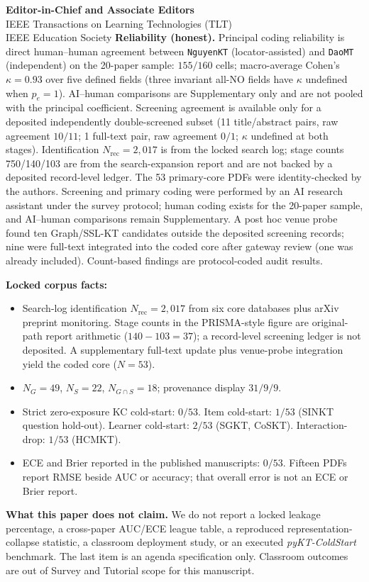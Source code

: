 \documentclass[11pt]{letter}
\begin{document}
\begin{letter}{
\textbf{Editor-in-Chief and Associate Editors}\\
IEEE Transactions on Learning Technologies (TLT)\\
IEEE Education Society
}
\textbf{Reliability (honest).} Principal coding reliability is direct human--human agreement between \texttt{NguyenKT} (locator-assisted) and \texttt{DaoMT} (independent) on the 20-paper sample: $155/160$ cells; macro-average Cohen's $\kappa=0.93$ over five defined fields (three invariant all-NO fields have $\kappa$ undefined when $p_e=1$). AI--human comparisons are Supplementary only and are not pooled with the principal coefficient. Screening agreement is available only for a deposited independently double-screened subset (11 title/abstract pairs, raw agreement $10/11$; 1 full-text pair, raw agreement $0/1$; $\kappa$ undefined at both stages). Identification $N_{\mathrm{rec}}=2{,}017$ is from the locked search log; stage counts 750/140/103 are from the search-expansion report and are not backed by a deposited record-level ledger. The 53 primary-core PDFs were identity-checked by the authors. Screening and primary coding were performed by an AI research assistant under the survey protocol; human coding exists for the 20-paper sample, and AI--human comparisons remain Supplementary. A post hoc venue probe found ten Graph/SSL-KT candidates outside the deposited screening records; nine were full-text integrated into the coded core after gateway review (one was already included). Count-based findings are protocol-coded audit results.

\textbf{Locked corpus facts:}
\begin{itemize}
    \item Search-log identification $N_{\mathrm{rec}}=2{,}017$ from six core databases plus arXiv preprint monitoring. Stage counts in the PRISMA-style figure are original-path report arithmetic ($140-103=37$); a record-level screening ledger is not deposited. A supplementary full-text update plus venue-probe integration yield the coded core ($N=53$).
    \item $N_G=49$, $N_S=22$, $N_{G\cap S}=18$; provenance display $31/9/9$.
    \item Strict zero-exposure KC cold-start: $0/53$. Item cold-start: $1/53$ (SINKT question hold-out). Learner cold-start: $2/53$ (SGKT, CoSKT). Interaction-drop: $1/53$ (HCMKT).
    \item ECE and Brier reported in the published manuscripts: $0/53$. Fifteen PDFs report RMSE beside AUC or accuracy; that overall error is not an ECE or Brier report.
\end{itemize}

\textbf{What this paper does not claim.} We do not report a locked leakage percentage, a cross-paper AUC/ECE league table, a reproduced representation-collapse statistic, a classroom deployment study, or an executed \emph{pyKT-ColdStart} benchmark. The last item is an agenda specification only. Classroom outcomes are out of Survey and Tutorial scope for this manuscript.


\end{letter}
\end{document}
